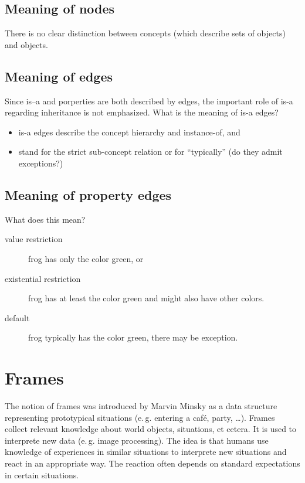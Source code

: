 \documentclass[openany]{scrbook}
\theoremstyle{break}
\theoremstyle{nonumberbreak}
\theoremstyle{nonumberplain}
\theoremstyle{nonumberbreak}
\newcommand{\eg}{e{.}\,g{.}\xspace}
\begin{document}
\subsection{Meaning of nodes}
There is no clear distinction between concepts (which describe sets of
objects) and objects.

\subsection{Meaning of edges}
Since is--a and porperties are both described by edges, the important
role of is-a regarding inheritance is not emphasized. What is the
meaning of is-a edges?
\begin{itemize}
\item is-a edges describe the concept hierarchy and instance-of, and
\item stand for the strict sub-concept relation or for ``typically''
  (do they admit exceptions?)
\end{itemize}

\subsection{Meaning of property edges}
What does this mean?
\begin{description}
\item[value restriction] frog has only the color green, or
\item[existential restriction] frog has at least the color green and
  might also have other colors.
\item[default] frog typically has the color green, there may be exception.
\end{description}

\section{Frames}
The notion of frames was introduced by Marvin Minsky as a data
structure representing prototypical situations (\eg entering a café,
party, \ldots). Frames collect relevant knowledge about world objects,
situations, et cetera. It is used to interprete new data (\eg image
processing). The idea is that humans use knowledge of experiences in
similar situations to interprete new situations and react in an
appropriate way. The reaction often depends on standard expectations
in certain situations.
\end{document}
